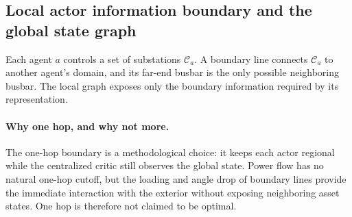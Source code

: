 


\subsection{Local actor information boundary and the global state graph}
\label{subsec:graph-local-global}

Each agent $a$ controls a set of substations $\mathcal{C}_a$. A
boundary line connects $\mathcal{C}_a$ to another agent's domain, and
its far-end busbar is the only possible neighboring busbar. The local graph
exposes only the boundary information required by its representation.

{\color{clarif}
\paragraph{Why one hop, and why not more.}
The one-hop boundary is a methodological choice: it keeps each actor regional
while the centralized critic still observes the global state. Power flow has no
natural one-hop cutoff, but the loading and angle drop of boundary lines provide
the immediate interaction with the exterior without exposing neighboring asset
states. One hop is therefore not claimed to be optimal.}

